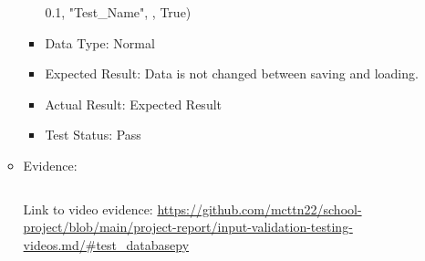 \documentclass[./project-report/src/latex/project-report.tex]{subfiles}
\begin{document}
\begin{itemize}
\begin{itemize}
\begin{itemize}
                      0.1, \newline
                      "Test\_Name", , \newline
                      True)
				\item Data Type: Normal
				\item Expected Result: Data is not changed between saving and loading.
				\item Actual Result: Expected Result
				\item Test Status: Pass
			\end{itemize}
            \item Evidence:
                \inputminted{python}{./school_project/test/test_database.py}

				\pagebreak

				\begin{figure}[h!]
				\centering
				\end{figure}

				Link to video evidence: \url{https://github.com/mcttn22/school-project/blob/main/project-report/input-validation-testing-videos.md/#test_databasepy}
		\end{itemize}
    

\end{itemize}
\end{document}

